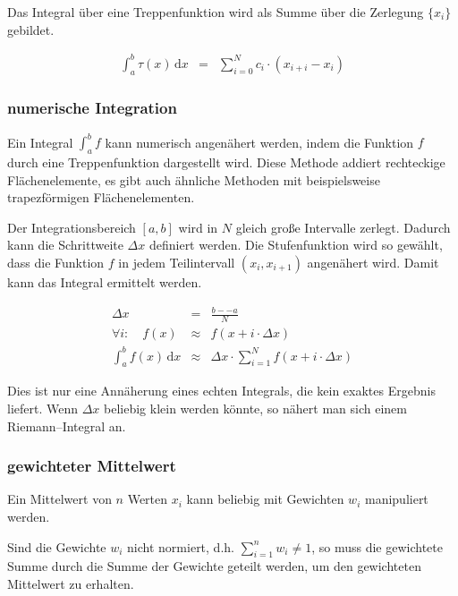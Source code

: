 \documentclass[12pt,a4paper]{scrartcl}
\numberwithin{equation}{section} %
\renewcommand{\[}{} %
\renewcommand{\]}{\noindent} %
\begin{document}
\noindent
Das Integral über eine Treppenfunktion wird als Summe über die Zerlegung \(\{x_i\}\) gebildet.

\[
\begin{eqnarray}
    \int_a^b\tau(x)\,\mathrm dx
        &=& \sum_{i=0}^N c_i\cdot (x_{i+i}-x_i)
\end{eqnarray}
\]

\hypertarget{numerische-integration}{%
\subsubsection{numerische Integration}\label{numerische-integration}}

Ein Integral \(\int_a^b f\) kann numerisch angenähert werden, indem die Funktion \(f\) durch eine Treppenfunktion dargestellt wird. Diese Methode addiert rechteckige Flächenelemente, es gibt auch ähnliche Methoden mit beispielsweise trapezförmigen Flächenelementen.

Der Integrationsbereich \([a,b]\) wird in \(N\) gleich große Intervalle zerlegt. Dadurch kann die Schrittweite \(\Delta x\) definiert werden. Die Stufenfunktion wird so gewählt, dass die Funktion \(f\) in jedem Teilintervall \((x_i, x_{i+1})\) angenähert wird. Damit kann das Integral ermittelt werden.

\[
\begin{eqnarray}
    \Delta x &=& \frac{b--a}{N} \\
    \forall i:\quad
        f(x) &\approx& f(x+i\cdot\Delta x) \\
    \int_a^b f(x) \,\mathrm dx
        &\approx& \Delta x\cdot
            \sum_{i=1}^N f(x + i\cdot \Delta x)
\end{eqnarray}
\]

\noindent
Dies ist nur eine Annäherung eines echten Integrals, die kein exaktes Ergebnis liefert. Wenn \(\Delta x\) beliebig klein werden könnte, so nähert man sich einem Riemann--Integral an.

\hypertarget{gewichteter-mittelwert}{%
\subsubsection{gewichteter Mittelwert}\label{gewichteter-mittelwert}}

Ein Mittelwert von \(n\) Werten \(x_i\) kann beliebig mit Gewichten \(w_i\) manipuliert werden.

Sind die Gewichte \(w_i\) nicht normiert, d.h. \(\sum_{i=1}^n w_i\neq 1\), so muss die gewichtete Summe durch die Summe der Gewichte geteilt werden, um den gewichteten Mittelwert zu erhalten.
\end{document}
